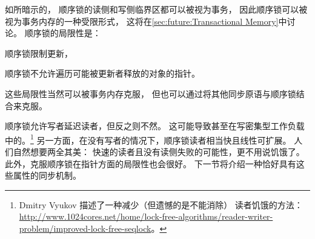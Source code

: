 如所暗示的，
顺序锁的读侧和写侧临界区都可以被视为事务，
因此顺序锁可以被视为事务内存的一种受限形式，
这将在\cref{sec:future:Transactional Memory}中讨论。
顺序锁的局限性是：
\begin{enumerate*}[(1)]
\item 顺序锁限制更新，
\item 顺序锁不允许遍历可能被更新者释放的对象的指针。
\end{enumerate*}
这些局限性当然可以被事务内存克服，
但也可以通过将其他同步原语与顺序锁结合来克服。

顺序锁允许写者延迟读者，但反之则不然。
这可能导致甚至在写密集型工作负载中的。\footnote{
	Dmitry Vyukov 描述了一种减少（但遗憾的是不能消除）
	读者饥饿的方法：
	\url{http://www.1024cores.net/home/lock-free-algorithms/reader-writer-problem/improved-lock-free-seqlock}。}
另一方面，在没有写者的情况下，顺序锁读者相当快且线性可扩展。
人们自然想要两全其美：
快速的读者且没有读侧失败的可能性，更不用说饥饿了。
此外，克服顺序锁在指针方面的局限性也会很好。
下一节将介绍一种恰好具有这些属性的同步机制。
